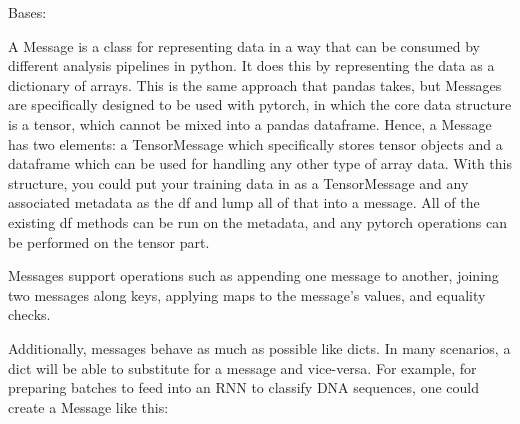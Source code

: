 \documentclass[letterpaper,10pt,english]{sphinxmanual}
\begin{document}
\label{\detokenize{Fireworks:module-Fireworks.core.message}}

\begin{fulllineitems}
\label{\detokenize{Fireworks:Fireworks.core.message.Message}}
Bases: 

A Message is a class for representing data in a way that can be consumed by different analysis pipelines in python. It does this by
representing the data as a dictionary of arrays. This is the same approach that pandas takes, but Messages are specifically designed to
be used with pytorch, in which the core data structure is a tensor, which cannot be mixed into a pandas dataframe.
Hence, a Message has two elements: a TensorMessage which specifically stores tensor objects and a dataframe which can be used for handling
any other type of array data. With this structure, you could put your training data in as a TensorMessage and any associated metadata as
the df and lump all of that into a message. All of the existing df methods can be run on the metadata, and any pytorch operations can be
performed on the tensor part.

Messages support operations such as appending one message to another, joining two messages along keys, applying maps to the message’s values,
and equality checks.

Additionally, messages behave as much as possible like dicts. In many scenarios, a dict will be able to substitute for a message and vice-versa.
For example, for preparing batches to feed into an RNN to classify DNA sequences, one could create a Message like this:

%
\begin{sphinxVerbatim}[commandchars=\\\{\}]
  
 \PYG{p}{[}\PYG{p}{]}
 \PYG{p}{[}\PYG{p}{]}
 \PYG{p}{[}\PYG{p}{]}
\end{sphinxVerbatim}


\end{fulllineitems}
\end{document}
